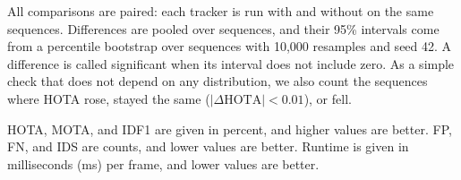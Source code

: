 

All comparisons are paired: each tracker is run with and without \scl{} on
the same sequences. Differences are pooled over sequences, and their 95\%
intervals come from a percentile bootstrap over sequences
\cite{efron1993bootstrap} with 10,000 resamples and seed 42. A difference is
called significant when its interval does not include zero. As a simple
check that does not depend on any distribution, we also count the sequences
where HOTA rose, stayed the same ($|\Delta\mathrm{HOTA}|<0.01$), or fell.

HOTA, MOTA, and IDF1 are given in percent, and higher values are better. FP,
FN, and IDS are counts, and lower values are better. Runtime is given in
milliseconds (ms) per frame, and lower values are better.
